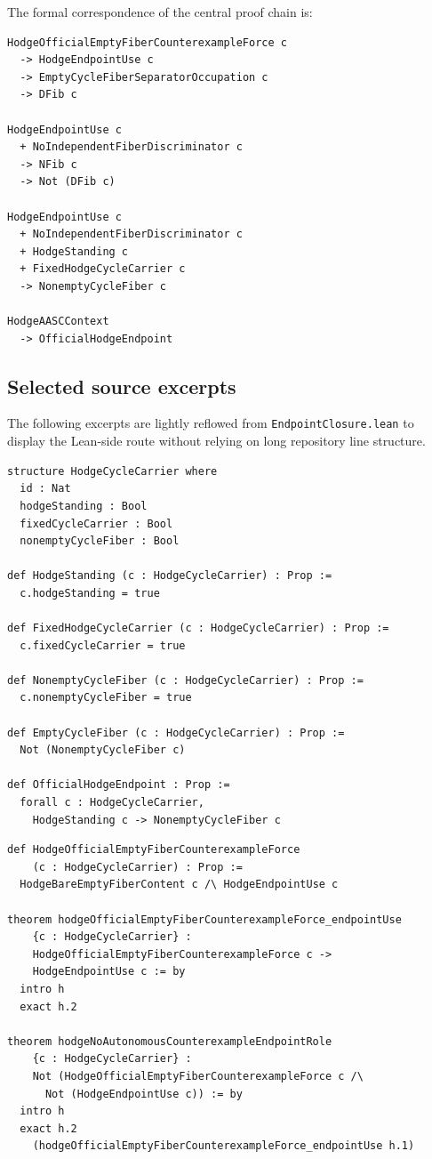 \documentclass[11pt]{article}
\begin{document}
The formal correspondence of the central proof chain is:
\begin{verbatim}
HodgeOfficialEmptyFiberCounterexampleForce c
  -> HodgeEndpointUse c
  -> EmptyCycleFiberSeparatorOccupation c
  -> DFib c

HodgeEndpointUse c
  + NoIndependentFiberDiscriminator c
  -> NFib c
  -> Not (DFib c)

HodgeEndpointUse c
  + NoIndependentFiberDiscriminator c
  + HodgeStanding c
  + FixedHodgeCycleCarrier c
  -> NonemptyCycleFiber c

HodgeAASCContext
  -> OfficialHodgeEndpoint
\end{verbatim}

\subsection{Selected source excerpts}

The following excerpts are lightly reflowed from \texttt{EndpointClosure.lean} to display the Lean-side route without relying on long repository line structure.

\begin{verbatim}
structure HodgeCycleCarrier where
  id : Nat
  hodgeStanding : Bool
  fixedCycleCarrier : Bool
  nonemptyCycleFiber : Bool

def HodgeStanding (c : HodgeCycleCarrier) : Prop :=
  c.hodgeStanding = true

def FixedHodgeCycleCarrier (c : HodgeCycleCarrier) : Prop :=
  c.fixedCycleCarrier = true

def NonemptyCycleFiber (c : HodgeCycleCarrier) : Prop :=
  c.nonemptyCycleFiber = true

def EmptyCycleFiber (c : HodgeCycleCarrier) : Prop :=
  Not (NonemptyCycleFiber c)

def OfficialHodgeEndpoint : Prop :=
  forall c : HodgeCycleCarrier,
    HodgeStanding c -> NonemptyCycleFiber c
\end{verbatim}

\begin{verbatim}
def HodgeOfficialEmptyFiberCounterexampleForce
    (c : HodgeCycleCarrier) : Prop :=
  HodgeBareEmptyFiberContent c /\ HodgeEndpointUse c

theorem hodgeOfficialEmptyFiberCounterexampleForce_endpointUse
    {c : HodgeCycleCarrier} :
    HodgeOfficialEmptyFiberCounterexampleForce c ->
    HodgeEndpointUse c := by
  intro h
  exact h.2

theorem hodgeNoAutonomousCounterexampleEndpointRole
    {c : HodgeCycleCarrier} :
    Not (HodgeOfficialEmptyFiberCounterexampleForce c /\
      Not (HodgeEndpointUse c)) := by
  intro h
  exact h.2
    (hodgeOfficialEmptyFiberCounterexampleForce_endpointUse h.1)
\end{verbatim}
\end{document}
